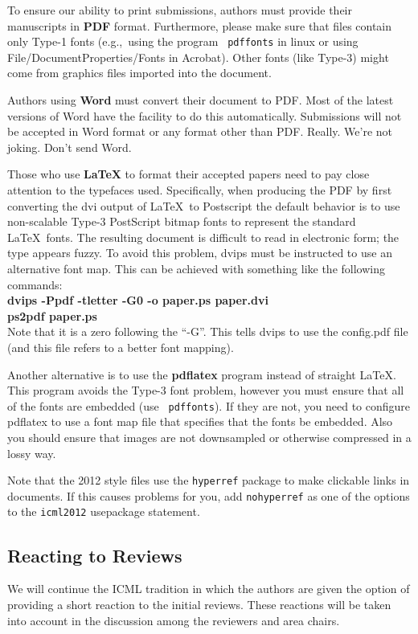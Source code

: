 \documentclass{article}
\begin{document}
\medskip

To ensure our ability to print submissions, authors must provide their
manuscripts in \textbf{PDF} format.  Furthermore, please make sure
that files contain only Type-1 fonts (e.g.,~using the program {\tt
  pdffonts} in linux or using File/DocumentProperties/Fonts in
Acrobat).  Other fonts (like Type-3) might come from graphics files
imported into the document.

Authors using \textbf{Word} must convert their document to PDF.  Most
of the latest versions of Word have the facility to do this
automatically.  Submissions will not be accepted in Word format or any
format other than PDF. Really. We're not joking. Don't send Word.

Those who use \textbf{\LaTeX} to format their accepted papers need to
pay close attention to the typefaces used.  Specifically, when
producing the PDF by first converting the dvi output of \LaTeX\ to Postscript
the default behavior is to use non-scalable Type-3 PostScript bitmap
fonts to represent the standard \LaTeX\ fonts. The resulting document
is difficult to read in electronic form; the type appears fuzzy. To
avoid this problem, dvips must be instructed to use an alternative
font map.  This can be achieved with
something like the following commands:\\[0.5em]
{\bf dvips -Ppdf -tletter -G0 -o paper.ps paper.dvi}\\
{\bf ps2pdf paper.ps}\\[0.5em]
Note that it is a zero following the ``-G''.  This tells dvips to use
the config.pdf file (and this file refers to a better font mapping).

Another alternative is to use the \textbf{pdflatex} program instead of
straight \LaTeX. This program avoids the Type-3 font problem, however
you must ensure that all of the fonts are embedded (use {\tt
pdffonts}). If they are not, you need to configure pdflatex to use a
font map file that specifies that the fonts be embedded. Also you
should ensure that images are not downsampled or otherwise compressed
in a lossy way.

Note that the 2012 style files use the {\tt hyperref} package to
make clickable links in documents.  If this causes problems for you,
add {\tt nohyperref} as one of the options to the {\tt icml2012}
usepackage statement.

\subsection{Reacting to Reviews}
We will continue the ICML tradition in which the authors are given the
option of providing a short reaction to the initial reviews. These
reactions will be taken into account in the discussion among the
reviewers and area chairs.
\end{document}
